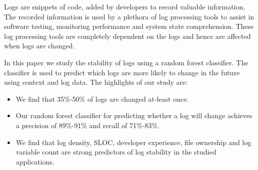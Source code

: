 Logs are snippets of code, added by developers to record valuable information. The recorded information is used by a plethora of log processing tools to assist in software testing, monitoring performance and system state comprehension. These log processing tools are completely dependent on the logs and hence are affected when logs are changed.

 In this paper we study the stability of logs using a random forest classifier. The classifier is used to predict which logs are more likely to change in the future using context and log data.  The highlights of our study are:

\begin{itemize}
	\item We find that 35\%-50\% of logs are changed at-least once.
	\item Our random forest classifier for predicting whether a log will change achieves a precision of 89\%-91\% and recall of 71\%-83\%. 
	\item We find that log density, SLOC, developer experience, file ownership and log variable count are strong predictors of log stability in the studied applications.  	
	
\end{itemize}




